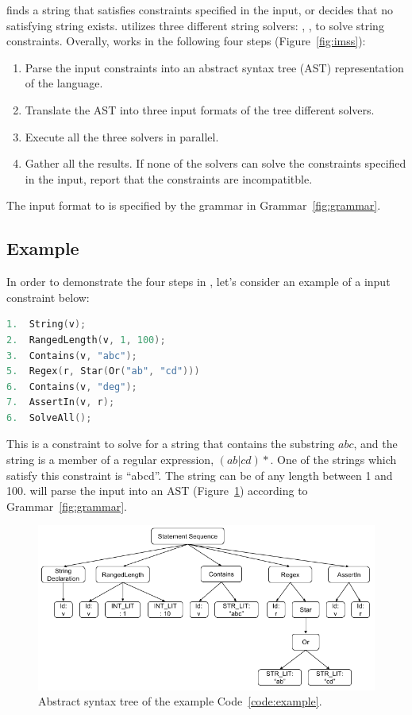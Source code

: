\imss finds a string that satisfies constraints specified in the input,
or decides that no satisfying string exists. \imss utilizes three different
string solvers: , ,  to solve string
constraints. Overally, \imss works in the following four steps (Figure~\ref{fig:imss}):
\begin{enumerate}
    \item Parse the input constraints into an abstract syntax tree (AST)
    representation of the \imss language.
    \item Translate the AST into three input formats of the tree different solvers.
    \item Execute all the three solvers in parallel.
    \item Gather all the results. If none of the solvers can solve the constraints
    specified in the input, report that the constraints are incompatitble.
\end{enumerate}
The input format to \imss is specified by the grammar in Grammar~\ref{fig:grammar}.

\subsection{Example}

In order to demonstrate the four steps in \imss, let's consider an example of a input constraint
below:
\renewcommand\lstlistingname{Code}
\begin{lstlisting}[label={code:example},frame=bt,numbers=none,basicstyle=\ttfamily\scriptsize,
language=C,captionpos=b,caption={Input constraint in \imss format}]
1.  String(v);
2.  RangedLength(v, 1, 100);
3.  Contains(v, "abc");
5.  Regex(r, Star(Or("ab", "cd")))
6.  Contains(v, "deg");
7.  AssertIn(v, r);
6.  SolveAll();
\end{lstlisting}
This is a constraint to solve for a string that contains the substring $abc$, and
the string is a member of a regular expression, $(ab|cd)*$.
One of the strings which satisfy this constraint is ``abcd''. The string can be of any length
between 1 and 100. \imss will parse the input into an AST (Figure~\ref{fig:exp-ast}) according to Grammar~\ref{fig:grammar}.

\begin{figure}[H]
    \centering
    \includegraphics[scale=0.35]{example-ast}
    \caption{\label{fig:exp-ast}Abstract syntax tree of the example Code~\ref{code:example}.}
\end{figure}

